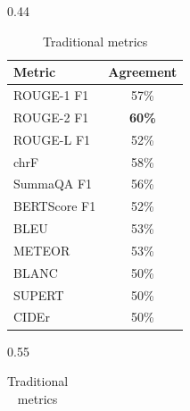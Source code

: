 \begin{table}[h!]
\centering
\footnotesize
\begin{subtable}[t]{0.44\textwidth}
\centering
\begin{tabular}{lc}
\toprule
\textbf{Metric} & \textbf{Agreement} \\
\midrule
ROUGE-1 F1        & 57\% \\
ROUGE-2 F1        & \textbf{60\%} \\
ROUGE-L F1        & 52\% \\
chrF              & 58\% \\
SummaQA F1        & 56\% \\
BERTScore F1      & 52\% \\
BLEU              & 53\% \\
METEOR            & 53\% \\
BLANC             & 50\% \\
SUPERT            & 50\% \\
CIDEr             & 50\% \\
\bottomrule
\end{tabular}
\caption{Traditional metrics}
\end{subtable}
\hfill
\begin{subtable}[t]{0.55\textwidth}
\centering
\begin{tabular}{lc}


\end{tabular}
\end{subtable}
\end{table}
